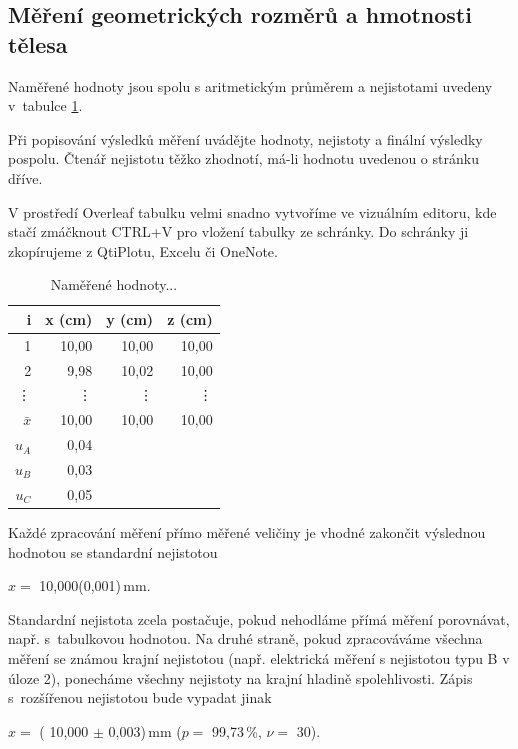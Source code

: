 \documentclass[a4paper,11pt]{article}
\newcommand{\vsn}[4]{\ensuremath{#1 =} #2(#3)\,#4}
\newcommand{\vrn}[6]{\ensuremath{#1 =} ( #2 $\pm$ #3)\,#4 ($p=$ #5\,\%, $\nu=$ #6)}
\begin{document}
\subsection{Měření geometrických rozměrů a hmotnosti tělesa}
Naměřené hodnoty jsou spolu s aritmetickým průměrem a nejistotami uvedeny v~tabulce \ref{tb:mer}.

Při popisování výsledků měření uvádějte hodnoty, nejistoty a finální výsledky pospolu. Čtenář nejistotu těžko zhodnotí, má-li hodnotu uvedenou o stránku dříve.

V prostředí Overleaf tabulku velmi snadno vytvoříme ve vizuálním editoru, kde stačí zmáčknout CTRL+V pro vložení tabulky ze schránky. Do schránky ji zkopírujeme z QtiPlotu, Excelu či OneNote.  

\begin{table}[ht]
\centering
\begin{tabular}{| r | r | r | r |}
\hline
i & x (cm) & y (cm) & z (cm) \\
\hline\hline
1 & 10,00 & 10,00 & 10,00 \\
2 & 9,98 & 10,02 & 10,00 \\
\vdots & \vdots & \vdots & \vdots \\
\hline\hline
$\bar{x}$ & 10,00 & 10,00 & 10,00\\\hline\hline
$u_A$ & 0,04 & &\\\hline
$u_B$ & 0,03 & &\\\hline
$u_C$ & 0,05 & &\\\hline
\end{tabular}
\caption{Naměřené hodnoty...}
\label{tb:mer}
\end{table}

Každé zpracování měření přímo měřené veličiny je vhodné zakončit výslednou hodnotou se standardní nejistotou
\begin{center}
\vsn{x}{10,000}{0,001}{mm}.
\end{center}
Standardní nejistota zcela postačuje, pokud nehodláme přímá měření porovnávat, např. s~tabulkovou hodnotou. Na druhé straně, pokud zpracováváme všechna měření se známou krajní nejistotou (např. elektrická měření s nejistotou typu B v úloze 2), ponecháme všechny nejistoty na krajní hladině spolehlivosti. Zápis s~rozšířenou nejistotou bude vypadat jinak 
\begin{center}
\vrn{x}{10,000}{0,003}{mm}{99,73}{30}.
\end{center}
\end{document}
